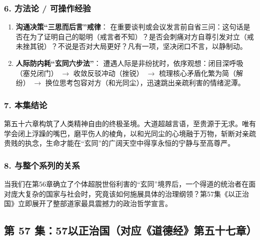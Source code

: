 \subsubsection{6. 方法论 / 可操作经验}
\begin{enumerate}
    \item \textbf{沟通决策“三思而后言”戒律}：
    在重要谈判或会议发言前自省三问：这句话是否在为了证明自己的聪明（戒言者不知）？是否会刺痛对方自尊引发对立（戒未挫其锐）？不说是否对大局更好？凡有一项，坚决闭口不言，以静制动。
    \item \textbf{人际防内耗“玄同六步法”}：
    遭遇人际是非纷扰时，依序观想：闭目深呼吸（塞兑闭门） $\rightarrow$ 收敛反驳冲动（挫锐） $\rightarrow$ 梳理核心矛盾化繁为简（解纷） $\rightarrow$ 换位思考包容对方（和光同尘），迅速跳出亲疏利害的情绪泥潭。
\end{enumerate}

\subsubsection{7. 本集结论}
第五十六章构筑了人类精神自由的终极圣境。大道超越言语，至贵源于无求。唯有学会闭上浮躁的嘴巴，磨平伤人的棱角，以和光同尘的心境融于万物，斩断对亲疏贵贱的执念，生命才能在“玄同”的广阔天空中得享永恒的宁静与至高尊严。

\subsubsection{8. 与整个系列的关系}
当我们在第56章确立了个体超脱世俗利害的“玄同”境界后，一个得道的统治者在面对庞大复杂的国家与社会时，究竟该如何施展具体的治理纲领？第57集《以正治国》立即展开了整部道家最具震撼力的政治哲学宣言。

\clearpage

\subsection{第 57 集：57以正治国（对应《道德经》第五十七章）}
\label{sec:ep57}

